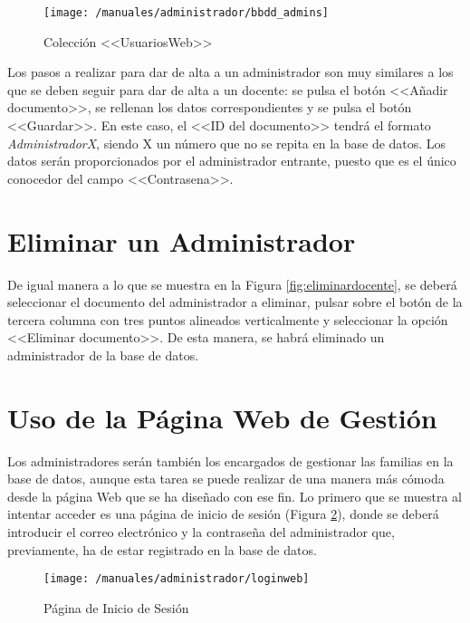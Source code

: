\begin{figure}[!h]
	\begin{center}
		\texttt{[image: /manuales/administrador/bbdd\_admins]}
		\caption{Colección <<UsuariosWeb>>}
		\label{fig:bbdduweb}
	\end{center}
\end{figure}

Los pasos a realizar para dar de alta a un administrador son muy similares a los que se deben seguir para dar de alta a un docente: se pulsa el botón <<Añadir documento>>, se rellenan los datos correspondientes y se pulsa el botón <<Guardar>>. En este caso, el <<ID del documento>> tendrá el formato \mbox{\textit{AdministradorX}}, siendo X un número que no se repita en la base de datos. Los datos serán proporcionados por el administrador entrante, puesto que es el único conocedor del campo <<Contrasena>>.

\section*{Eliminar un Administrador}
De igual manera a lo que se muestra en la Figura \ref{fig:eliminardocente}, se deberá seleccionar el documento del administrador a eliminar, pulsar sobre el botón de la tercera columna con tres puntos alineados verticalmente y seleccionar la opción <<Eliminar documento>>. De esta manera, se habrá eliminado un administrador de la base de datos.

\clearpage

\section*{Uso de la Página Web de Gestión}
Los administradores serán también los encargados de gestionar las familias en la base de datos, aunque esta tarea se puede realizar de una manera más cómoda desde la página Web que se ha diseñado con ese fin. Lo primero que se muestra al intentar acceder es una página de inicio de sesión (Figura \ref{fig:loginweb}), donde se deberá introducir el correo electrónico y la contraseña del administrador que, previamente, ha de estar registrado en la base de datos.

\begin{figure}[!h]
	\begin{center}
		\texttt{[image: /manuales/administrador/loginweb]}
		\caption{Página de Inicio de Sesión}
		\label{fig:loginweb}
	\end{center}
\end{figure}

